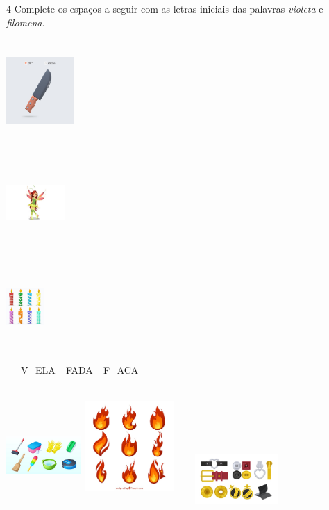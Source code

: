 \num{4} Complete os espaços a seguir com as letras iniciais das palavras
\textit{violeta} e \textit{filomena}.


\includegraphics[width=1.01042in,height=1.55278in]{media/image7.jpeg}

\includegraphics[width=0.87500in,height=1.40486in]{media/image8.jpeg}

\includegraphics[width=0.56250in,height=1.32083in]{media/image9.jpeg}

\_\_V\_ELA \_FADA \_F\_ACA

\includegraphics[width=1.12500in,height=1.48958in]{media/image10.jpeg}
\includegraphics[width=1.34375in,height=1.77083in]{media/image11.jpeg}
\includegraphics[width=1.77847in,height=0.76369in]{media/image12.jpeg}

